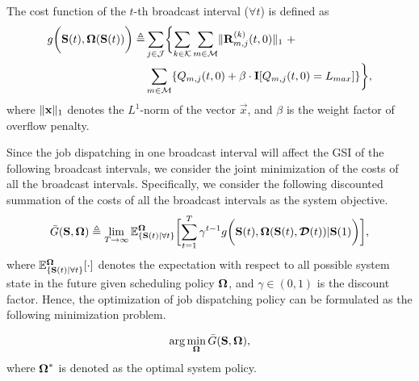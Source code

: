 \begin{definition}
    The cost function of the $t$-th broadcast interval ($\forall t$) is defined as
    \begin{align}
        g\Paren{\Stat(t), \Policy(\Stat(t))} \define
            &\sum_{j\in\jSpace} \Brace{
                \sum_{k\in\apSet} \sum_{m\in\esSet} \Inorm{\vec{R}^{(k)}_{m,j}(t,0)}~+
                \nonumber\\
                &\sum_{m\in\esSet} \{ Q_{m,j}(t,0) + \beta \cdot \mat{I}[Q_{m,j}(t,0)=L_{max}] \}
            },
    \end{align}
    where $\lVert\mathbf{x}\|_1$ denotes the $L^1$-norm of the vector $\vec{x}$, and $\beta$ is the weight factor of overflow penalty.
\end{definition}

Since the job dispatching in one broadcast interval will affect the GSI of the following broadcast intervals, we consider the joint minimization of the costs of all the broadcast intervals.
Specifically, we consider the following discounted summation of the costs of all the broadcast intervals as the system objective.
\begin{align}
    \bar{G}(\Stat, \Policy) \define \lim_{T \to \infty} \mathbb{E}^{\Policy}_{\set{\Stat(t)|\forall t}} \Bracket{
        \sum_{t=1}^{T} \gamma^{t-1} g\Paren{
            \Stat(t), \Policy(\Stat(t), \Delay(t)) | \Stat(1)
        }
    },
\end{align}
where $\mathbb{E}^{\boldsymbol{\Omega}}_{\{\mathbf{S}(t)|\forall t\}}[\cdot]$ denotes the expectation with respect to all possible system state in the future given scheduling policy $\boldsymbol{\Omega}$, and $\gamma \in (0,1)$ is the discount factor.
Hence, the optimization of job dispatching policy can be formulated as the following minimization problem.

\begin{problem}
    \begin{align}
        \arg\min_{\boldsymbol{\Omega}} \bar{G}(\mathbf{S}, \boldsymbol{\Omega}),
    \end{align}
    where $\boldsymbol{\Omega}^{*}$ is denoted as the optimal system policy.
    \label{problem_1}
\end{problem}

